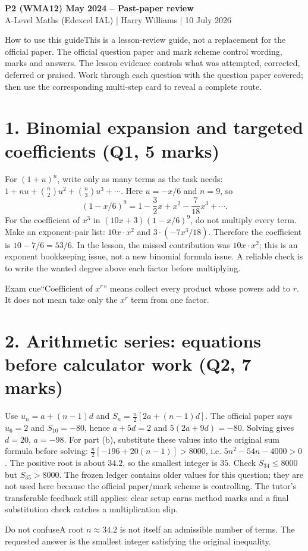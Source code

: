 \documentclass[10pt,a4paper]{article}
\begin{document}
\begin{center}{\LARGE\bfseries P2 (WMA12) May 2024 -- Past-paper review}\\[3pt]
{\large A-Level Maths (Edexcel IAL) | Harry Williams | 10 July 2026}\end{center}
\begin{keybox}{How to use this guide}This is a lesson-review guide, not a replacement for the official paper. The official question paper and mark scheme control wording, marks and answers. The lesson evidence controls what was attempted, corrected, deferred or praised. Work through each question with the question paper covered; then use the corresponding multi-step card to reveal a complete route.\end{keybox}
\section*{1. Binomial expansion and targeted coefficients (Q1, 5 marks)}
For $(1+u)^n$, write only as many terms as the task needs: $1+nu+\binom n2u^2+\binom n3u^3+\cdots$. Here $u=-x/6$ and $n=9$, so
\[ (1-x/6)^9=1-\frac32x+x^2-\frac7{18}x^3+\cdots. \]
For the coefficient of $x^3$ in $(10x+3)(1-x/6)^9$, do not multiply every term. Make an exponent-pair list: $10x\cdot x^2$ and $3\cdot(-7x^3/18)$. Therefore the coefficient is $10-7/6=53/6$. In the lesson, the missed contribution was $10x\cdot x^2$; this is an exponent bookkeeping issue, not a new binomial formula issue. A reliable check is to write the wanted degree above each factor before multiplying.\begin{trapbox}{Exam cue}``Coefficient of $x^r$'' means collect every product whose powers add to $r$. It does not mean take only the $x^r$ term from one factor.\end{trapbox}
\section*{2. Arithmetic series: equations before calculator work (Q2, 7 marks)}
Use $u_n=a+(n-1)d$ and $S_n=\frac n2[2a+(n-1)d]$. The official paper says $u_6=2$ and $S_{10}=-80$, hence $a+5d=2$ and $5(2a+9d)=-80$. Solving gives $d=20$, $a=-98$. For part (b), substitute these values into the original sum formula before solving: $\frac n2[-196+20(n-1)]>8000$, i.e. $5n^2-54n-4000>0$. The positive root is about $34.2$, so the smallest integer is $35$. Check $S_{34}\le8000$ but $S_{35}>8000$. The frozen ledger contains older values for this question; they are not used here because the official paper/mark scheme is controlling. The tutor's transferable feedback still applies: clear setup earns method marks and a final substitution check catches a multiplication slip.\begin{trapbox}{Do not confuse}A root $n\approx34.2$ is not itself an admissible number of terms. The requested answer is the smallest integer satisfying the original inequality.\end{trapbox}
\newpage
\end{document}
